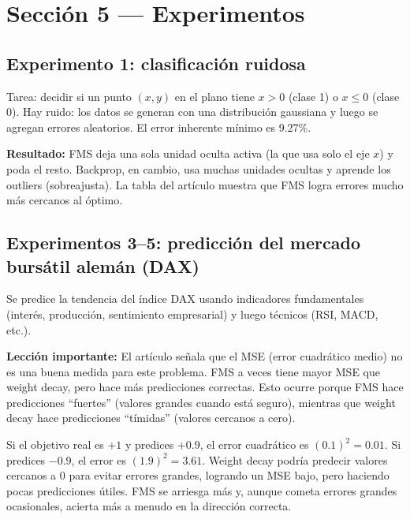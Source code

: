 \documentclass[11pt,a4paper]{article}
\newcounter{ejemplo}
\newenvironment{ejemplo}[1][]{%
  \refstepcounter{ejemplo}%
  \begin{tcolorbox}[colback=grisclaro,colframe=naranja,title=Ejemplo intuitivo \theejemplo: #1,breakable]}%
  {\end{tcolorbox}}
\begin{document}
\section{Sección 5 — Experimentos}
\label{sec:sec5}

\subsection{Experimento 1: clasificación ruidosa}

Tarea: decidir si un punto $(x, y)$ en el plano tiene $x > 0$ (clase 1) o $x \leq 0$ (clase 0). Hay ruido: los datos se generan con una distribución gaussiana y luego se agregan errores aleatorios. El error inherente mínimo es 9.27\%.

\textbf{Resultado:} FMS deja una sola unidad oculta activa (la que usa solo el eje $x$) y poda el resto. Backprop, en cambio, usa muchas unidades ocultas y aprende los outliers (sobreajusta). La tabla del artículo muestra que FMS logra errores mucho más cercanos al óptimo.

\subsection{Experimentos 3--5: predicción del mercado bursátil alemán (DAX)}

Se predice la tendencia del índice DAX usando indicadores fundamentales (interés, producción, sentimiento empresarial) y luego técnicos (RSI, MACD, etc.).

\textbf{Lección importante:} El artículo señala que el MSE (error cuadrático medio) no es una buena medida para este problema. FMS a veces tiene mayor MSE que weight decay, pero hace más predicciones correctas. Esto ocurre porque FMS hace predicciones ``fuertes'' (valores grandes cuando está seguro), mientras que weight decay hace predicciones ``tímidas'' (valores cercanos a cero).

\begin{ejemplo}[Por qué MSE puede ser engañoso]
Si el objetivo real es $+1$ y predices $+0.9$, el error cuadrático es $(0.1)^2 = 0.01$. Si predices $-0.9$, el error es $(1.9)^2 = 3.61$. Weight decay podría predecir valores cercanos a 0 para evitar errores grandes, logrando un MSE bajo, pero haciendo pocas predicciones útiles. FMS se arriesga más y, aunque cometa errores grandes ocasionales, acierta más a menudo en la dirección correcta.
\end{ejemplo}
\end{document}
